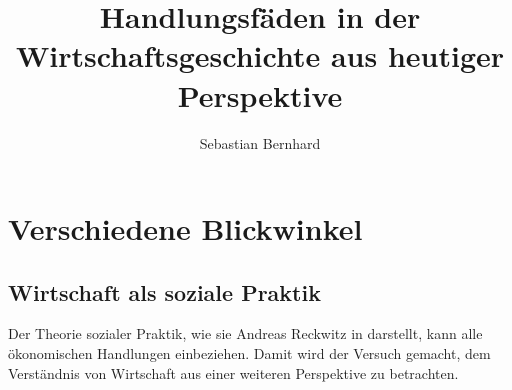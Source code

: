 \documentclass[a4paper]{book}
\begin{document}
\author{Sebastian Bernhard}
\title{Handlungsfäden in der Wirtschaftsgeschichte aus heutiger Perspektive}
\maketitle
\tableofcontents

\part{Verschiedene Blickwinkel}

\chapter{Wirtschaft als soziale Praktik}

Der Theorie sozialer Praktik, wie sie Andreas Reckwitz in
\cite{reckwitz2003praktiken} darstellt, kann alle ökonomischen 
Handlungen einbeziehen. Damit wird der Versuch gemacht, dem 
Verständnis von Wirtschaft aus einer weiteren Perspektive
zu betrachten.

















 
\end{document}
